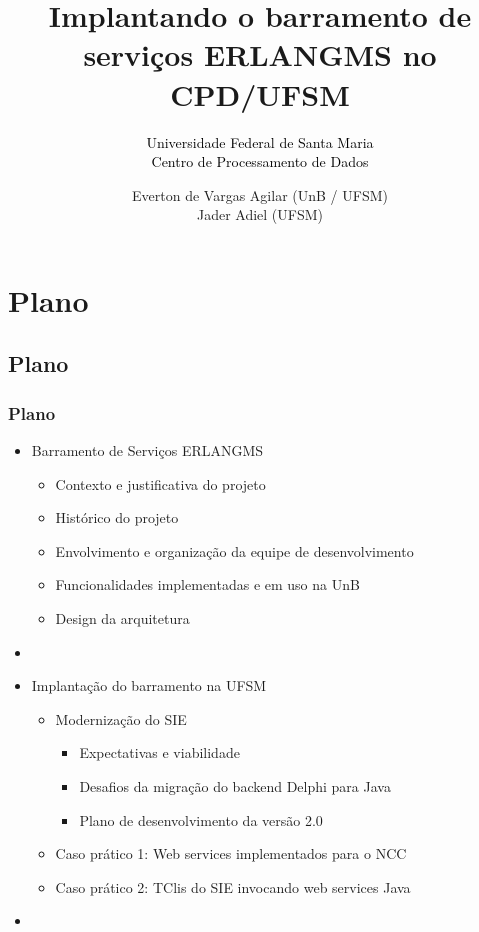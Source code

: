 \documentclass{beamer}
\title{Implantando o barramento de serviços ERLANGMS no CPD/UFSM}
\subtitle{ \textcolor{black}{Universidade Federal de Santa Maria} \\
			\textcolor{black}{\small{Centro de Processamento de Dados}} 
}
\author{Everton de Vargas Agilar (UnB / UFSM) \\
		Jader Adiel (UFSM)
}
\begin{document}
\begin{frame}
  \titlepage
\end{frame}





\section{Plano}


\subsection{Plano}

\begin{frame}
  \frametitle{Plano}

    \begin{itemize}

	    \item<1-> Barramento de Serviços ERLANGMS
		    \begin{itemize}
		  	  \item<1->Contexto e justificativa do projeto
	    	  \item<1->Histórico do projeto
	    	  \item<1->Envolvimento e organização da equipe de desenvolvimento
  	  	 	  \item<1->Funcionalidades implementadas e em uso na UnB
  	  	 	  \item<1->Design da arquitetura
		    \end{itemize}
	   	  \item<1-> 

	    \item<1-> Implantação do barramento na UFSM
		    \begin{itemize}
			\item<1->Modernização do SIE
			    \begin{itemize}
					\item<1->Expectativas e viabilidade
					\item<1->Desafios da migração do backend Delphi para Java
					\item<1->Plano de desenvolvimento da versão 2.0
				\end{itemize}
			\item<1->Caso prático 1: Web services implementados para o NCC
			\item<1->Caso prático 2: TClis do SIE invocando web services Java
		    \end{itemize}
   	    \item<1-> 
   	    


	 \end{itemize}	   	  

\end{frame}
\end{document}
